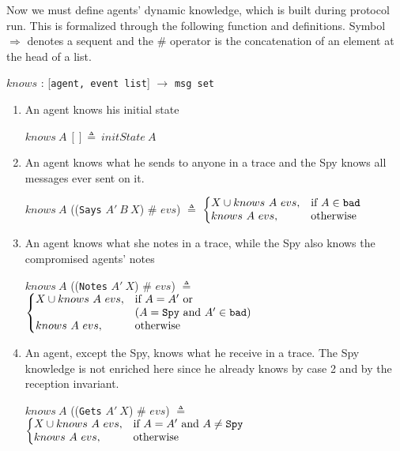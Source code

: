 Now we must define agents' dynamic knowledge, which is built during protocol run. This is formalized through the following function and definitions. Symbol $\Longrightarrow$ denotes a sequent and the \# operator is the concatenation of an element at the head of a list.

\begin{center}
  $knows$ : [\texttt{agent, event list}] $\longrightarrow$ \texttt{msg set}
\end{center}

\begin{enumerate}
  \item An agent knows his initial state
  \begin{center}
    $knows\ A\ [] \triangleq\ initState\ A$
  \end{center}
  \item An agent knows what he sends to anyone in a trace and the Spy knows all messages ever sent on it.
  \begin{center}
    $knows\ A$ ((\texttt{Says} $A'\ B \ X$) \# $evs$) $\triangleq$
    $\left\{
      \begin{array}{@{}ll@{}}
        {X} \cup knows\ A\ evs, & \text{if } A \in \texttt{bad} \\
        knows\ A\ evs, & \text{otherwise}
      \end{array} \right.$
  \end{center}
  \item An agent knows what she notes in a trace, while the Spy also knows the compromised agents' notes
  \begin{center}
    $knows\ A$ ((\texttt{Notes} $A'\ X$) \# $evs$) $\triangleq$
    $\left\{
      \begin{array}{@{}ll@{}}
        {X} \cup knows\ A\ evs, & \text{if } A = A' \text{ or } \\ & (A = \texttt{Spy} \text{ and } A' \in \texttt{bad}) \\
        knows\ A\ evs, & \text{otherwise}
      \end{array} \right.$
  \end{center}
  \item An agent, except the Spy, knows what he receive in a trace. The Spy knowledge is not enriched here since he already knows by case 2 and by the reception invariant.
  \begin{center}
    $knows\ A$ ((\texttt{Gets} $A'\ X$) \# $evs$) $\triangleq$
    $\left\{
      \begin{array}{@{}ll@{}}
        {X} \cup knows\ A\ evs, & \text{if } A = A' \text{ and } A \neq \texttt{Spy} \\
        knows\ A\ evs, & \text{otherwise}
      \end{array} \right.$
  \end{center}
\end{enumerate}

